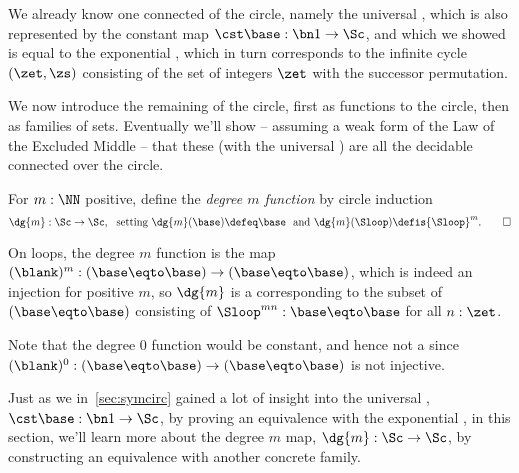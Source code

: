 We already know one connected \covering of the circle, namely the universal \covering, which is also represented by the constant map $\cst\base:\bn 1\to\Sc$, and which we showed is equal to the exponential \covering, which in turn corresponds to the infinite cycle $(\zet,\zs)$
consisting of the set of integers $\zet$ with the successor permutation.

We now introduce the remaining \coverings of the circle, first as functions to the circle, then as families of sets.
Eventually we'll show -- assuming a weak form
of the Law of the Excluded Middle -- that these (with the universal \covering)
are all the decidable connected \coverings over the circle.

\begin{definition}\label{def:mfoldS1cover}
For $m:\NN$ positive, define the \emph{degree $m$ function} by circle induction
\[
\dg{m}:\Sc\to \Sc, \text{~~setting~}
\dg{m}(\base)\defeq\base \text{~~and~}
\dg{m}(\Sloop)\defis{\Sloop}^m.\qedhere
\]
\end{definition}
On loops, the degree $m$ function is the map
$(\blank)^m : (\base\eqto \base) \to (\base\eqto \base)$,
which is indeed an injection for positive $m$,
so $\dg{m}$ is a \covering corresponding to the subset of $(\base\eqto \base)$ consisting
of ${\Sloop}^{mn} : \base\eqto \base$ for all $n:\zet$.

Note that the degree $0$ function would be constant,
and hence not a \covering since $(\blank)^0 : (\base\eqto \base) \to (\base\eqto \base)$
is not injective.

Just as we in~\cref{sec:symcirc} gained a lot of insight into the universal \covering,
$\cst\base:\bn 1\to\Sc$,
by proving an equivalence with the exponential \covering,
in this section, we'll learn more about the degree $m$ map,
$\dg{m}:\Sc\to\Sc$,
by constructing an equivalence with another concrete family.

